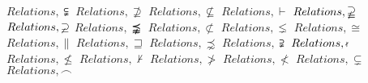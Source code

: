 \documentclass{article}
\begin{document}
$Relations,\subsetneqq$
\linebreak
\linebreak
$Relations,\nsupseteq$
\linebreak
\linebreak
$Relations,\nsubseteq$
\linebreak
\linebreak
$Relations,\vdash$
\linebreak
\linebreak
$Relations,\varsupsetneqq$
\linebreak
\linebreak
$Relations,\varsupsetneq$
\linebreak
\linebreak
$Relations,\precnapprox$
\linebreak
\linebreak
$Relations,\not\subset$
\linebreak
\linebreak
$Relations,\lneq$
\linebreak
\linebreak
$Relations,\cong$
\linebreak
\linebreak
$Relations,\parallel$
\linebreak
\linebreak
$Relations,\sqsupseteq$
\linebreak
\linebreak
$Relations,\precnsim$
\linebreak
\linebreak
$Relations,\supsetneqq$
\linebreak
\linebreak
$Relations,\nshortmid$
\linebreak
\linebreak
$Relations,\nleq$
\linebreak
\linebreak
$Relations,\nvdash$
\linebreak
\linebreak
$Relations,\ngtr$
\linebreak
\linebreak
$Relations,\nless$
\linebreak
\linebreak
$Relations,\subsetneq$
\linebreak
\linebreak
$Relations,\frown$
\linebreak
\linebreak
\end{document}
